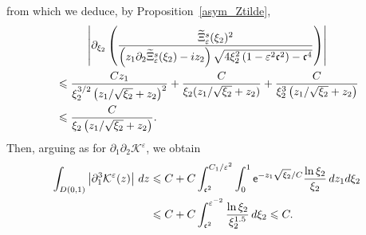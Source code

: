 \documentclass[10pt]{amsart}
\theoremstyle{definition}\newtheorem{defi}[theo]{Definition}\newtheorem{rema}[theo]{Remark}\newtheorem{exam}[theo]{Example}\newtheorem{exem}[theo]{Example}\newtheorem{nota}[theo]{Notation}
\newcommand*\p{\partial}
\newcommand*\BK{\mathcal{K}}
\newcommand*\ex{{\sf e}}
\newcommand*\cs{{\mathfrak c}}
\newcommand*\ls{\leqslant }
\newcommand*\e{\varepsilon}
\renewcommand*\t{\tilde}
\let\oldtilde\tilde
\renewcommand*{\tilde}[1]{\mathchoice{\widetilde{#1}}{\widetilde{#1}}{\oldtilde{#1}}{\oldtilde{#1}}}
\begin{document}
from which we deduce, by Proposition~\ref{asym_Ztilde},
\begin{multline*}
\left\lvert \p_{\xi_2}  \left(\frac{ \t\Xi_\e^s (\xi_2)^2}{\left(z_1 \p_2 \t\Xi_\e^s (\xi_2) - i z_2\right) \sqrt{4 \xi_2^2\left(1 - \e^2 \cs^2\right) - \cs^4}} \right) \right\rvert
\\
\begin{aligned}
&\ls \frac{ C z_1 }{ \xi_2^{3/2 } \left(z_1 / \sqrt{\xi_2 } + z_2\right)^2 } + \frac{ C}{ \xi_2 (z_1 / \sqrt{\xi_2 } + z_2) } + \frac{ C}{ \xi_2 ^3 \left(z_1 / \sqrt{\xi_2 } + z_2\right) }
\\ & \ls \frac{ C}{ \xi_2 \left(z_1 / \sqrt{\xi_2 } + z_2\right) }.
\end{aligned}
\end{multline*}
Then, arguing as for $ \p_1\p_2 \BK^\e $, we obtain
\begin{align*}
\int_{D(0,1)} \left\lvert \p_1^3 \BK^\e (z) \right\rvert \, dz & \ls C + C \int_{ \cs^2 }^{ C_1 / \e^{2} } \int_0^1 \ex^{- z_1 \sqrt{\xi_2}/C } \frac{\ln \xi_2 }{\xi_2} \, d z_1 d\xi_2
\\ & \ls C + C \int_{ \cs^2 }^{ \e^{-2} } \frac{\ln \xi_2}{ \xi_2^{1.5} } \, d \xi_2
\ls C.
\end{align*}
\end{document}
